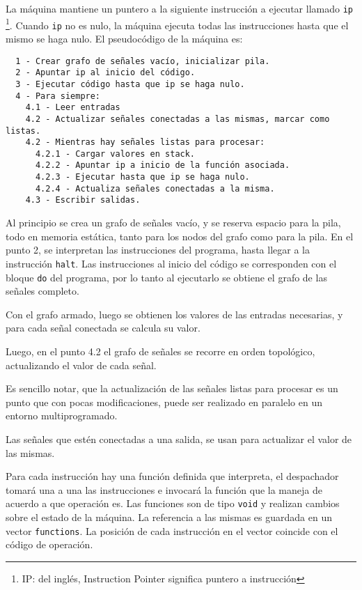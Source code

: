   La máquina mantiene un puntero a la siguiente instrucción a ejecutar llamado
  \texttt{ip} \footnote{IP: del inglés, Instruction Pointer significa puntero a instrucción}.
  Cuando \texttt{ip} no es nulo, la máquina ejecuta todas las instrucciones hasta
  que el mismo se haga nulo.
  El pseudocódigo de la máquina es:

\begin{Verbatim}
  1 - Crear grafo de señales vacío, inicializar pila.
  2 - Apuntar ip al inicio del código.
  3 - Ejecutar código hasta que ip se haga nulo.
  4 - Para siempre:
    4.1 - Leer entradas
    4.2 - Actualizar señales conectadas a las mismas, marcar como listas.
    4.2 - Mientras hay señales listas para procesar:
      4.2.1 - Cargar valores en stack.
      4.2.2 - Apuntar ip a inicio de la función asociada.
      4.2.3 - Ejecutar hasta que ip se haga nulo.
      4.2.4 - Actualiza señales conectadas a la misma.
    4.3 - Escribir salidas.
\end{Verbatim}

  Al principio se crea un grafo de señales vacío, y se reserva espacio para la pila, todo en memoria estática, tanto
  para los nodos del grafo como para la pila.
  En el punto 2, se interpretan las instrucciones del programa, hasta llegar a la instrucción \texttt{halt}. Las 
  instrucciones al inicio del código se corresponden con el bloque \texttt{do} del programa, por lo tanto
  al ejecutarlo se obtiene el grafo de las señales completo.

  Con el grafo armado, luego se obtienen los valores de las entradas
necesarias, y para cada señal conectada se calcula su valor.

  Luego, en el punto 4.2 el grafo de señales se recorre en orden
topológico, actualizando el valor de cada señal.

  Es sencillo notar, que la actualización de las señales listas para
procesar es un punto que con pocas modificaciones, puede ser realizado
en paralelo en un entorno multiprogramado.

  Las señales que estén conectadas a una salida, se usan para actualizar el valor de las mismas.

  Para cada instrucción hay una función definida que interpreta, el despachador
  tomará una a una las instrucciones e invocará la función que la maneja de acuerdo
  a que operación es.
  Las funciones son de tipo \texttt{void} y realizan cambios sobre el estado
  de la máquina. La referencia a las mismas es guardada en un vector \texttt{functions}.
  La posición de cada instrucción en el vector coincide con el código de operación.

